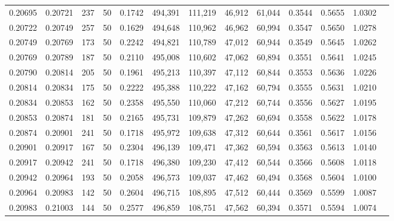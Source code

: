 \begin{tabular}{rrrrrrrrrrrrr}
0.20695 & 0.20721 &   237 &  50 &                                     0.1742 & 494,391 & 111,219 &  46,912 &  61,044 & 0.3544 & 0.5655 & 1.0302 \\
0.20722 & 0.20749 &   257 &  50 &                                     0.1629 & 494,648 & 110,962 &  46,962 &  60,994 & 0.3547 & 0.5650 & 1.0278 \\
0.20749 & 0.20769 &   173 &  50 &                                     0.2242 & 494,821 & 110,789 &  47,012 &  60,944 & 0.3549 & 0.5645 & 1.0262 \\
0.20769 & 0.20789 &   187 &  50 &                                     0.2110 & 495,008 & 110,602 &  47,062 &  60,894 & 0.3551 & 0.5641 & 1.0245 \\
0.20790 & 0.20814 &   205 &  50 &                                     0.1961 & 495,213 & 110,397 &  47,112 &  60,844 & 0.3553 & 0.5636 & 1.0226 \\
0.20814 & 0.20834 &   175 &  50 &                                     0.2222 & 495,388 & 110,222 &  47,162 &  60,794 & 0.3555 & 0.5631 & 1.0210 \\
0.20834 & 0.20853 &   162 &  50 &                                     0.2358 & 495,550 & 110,060 &  47,212 &  60,744 & 0.3556 & 0.5627 & 1.0195 \\
0.20853 & 0.20874 &   181 &  50 &                                     0.2165 & 495,731 & 109,879 &  47,262 &  60,694 & 0.3558 & 0.5622 & 1.0178 \\
0.20874 & 0.20901 &   241 &  50 &                                     0.1718 & 495,972 & 109,638 &  47,312 &  60,644 & 0.3561 & 0.5617 & 1.0156 \\
0.20901 & 0.20917 &   167 &  50 &                                     0.2304 & 496,139 & 109,471 &  47,362 &  60,594 & 0.3563 & 0.5613 & 1.0140 \\
0.20917 & 0.20942 &   241 &  50 &                                     0.1718 & 496,380 & 109,230 &  47,412 &  60,544 & 0.3566 & 0.5608 & 1.0118 \\
0.20942 & 0.20964 &   193 &  50 &                                     0.2058 & 496,573 & 109,037 &  47,462 &  60,494 & 0.3568 & 0.5604 & 1.0100 \\
0.20964 & 0.20983 &   142 &  50 &                                     0.2604 & 496,715 & 108,895 &  47,512 &  60,444 & 0.3569 & 0.5599 & 1.0087 \\
0.20983 & 0.21003 &   144 &  50 &                                     0.2577 & 496,859 & 108,751 &  47,562 &  60,394 & 0.3571 & 0.5594 & 1.0074 \\

\end{tabular}
